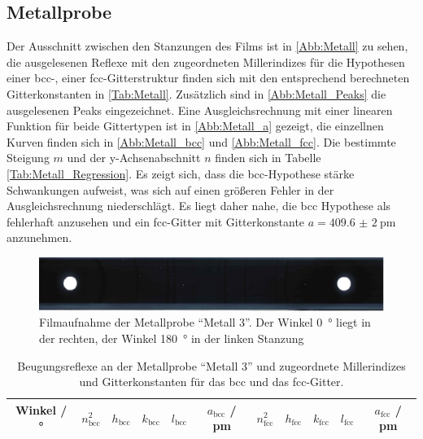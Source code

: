 \subsection{Metallprobe}
Der Ausschnitt zwischen den Stanzungen des Films ist in \autoref{Abb:Metall}
zu sehen, die ausgelesenen Reflexe mit den zugeordneten Millerindizes für die
Hypothesen einer bcc-, einer fcc-Gitterstruktur finden sich mit den entsprechend
berechneten Gitterkonstanten in \autoref{Tab:Metall}.
Zusätzlich sind in \autoref{Abb:Metall_Peaks} die ausgelesenen Peaks eingezeichnet.
Eine Ausgleichsrechnung mit einer linearen Funktion für beide Gittertypen ist in
\autoref{Abb:Metall_a} gezeigt, die einzellnen Kurven finden sich in \autoref{Abb:Metall_bcc}
und \autoref{Abb:Metall_fcc}.
Die bestimmte Steigung $m$ und der y-Achsenabschnitt $n$
finden sich in Tabelle \autoref{Tab:Metall_Regression}.
Es zeigt sich, dass die bcc-Hypothese stärke Schwankungen aufweist, was
sich auf einen größeren Fehler in der Ausgleichsrechnung niederschlägt.
Es liegt daher nahe, die bcc Hypothese als fehlerhaft anzusehen und ein fcc-Gitter
mit Gitterkonstante $a=\SI{409.6(20)}{\pico\metre}$ anzunehmen.


\begin{figure}
  \centering
  \includegraphics[scale=0.5]{content/pics/Metall_film.pdf}
  \caption{Filmaufnahme der Metallprobe \enquote{Metall 3}. Der Winkel \SI{0}{\degree} liegt in der
  rechten, der Winkel \SI{180}{\degree} in der linken Stanzung}
  \label{Abb:Metall}
\end{figure}

\begin{table}[H]
  \centering
  \caption{Beugungsreflexe an der Metallprobe \enquote{Metall 3} und zugeordnete Millerindizes
  und Gitterkonstanten für das bcc und das fcc-Gitter.}
  \label{Tab:Metall}
  \begin{tabular}{c || c c c c c|c c c c c}
    \toprule
    Winkel / ° &
    $n_{\text{bcc}}^{2}$ &
    $h_{\text{bcc}}$ &
    $k_{\text{bcc}}$ &
    $l_{\text{bcc}}$ &
    $a_{\text{bcc}}$ / pm &
    $n_{\text{fcc}}^{2}$ &
    $h_{\text{fcc}}$ &
    $k_{\text{fcc}}$ &
    $l_{\text{fcc}}$ &
    $a_{\text{fcc}}$ / pm \\
    \midrule
    
    \bottomrule
  \end{tabular}
\end{table}

